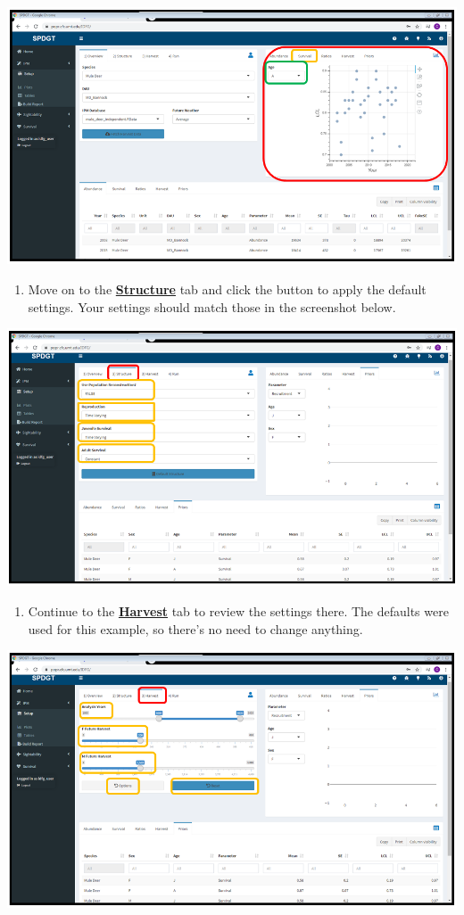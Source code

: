 \documentclass[
]{book}
\providecommand{\tightlist}{%
  \setlength{\itemsep}{0pt}\setlength{\parskip}{0pt}}
\begin{document}
\includegraphics{./www/ipm_04.PNG}

\begin{enumerate}
\def\labelenumi{\arabic{enumi}.}
\setcounter{enumi}{6}
\tightlist
\item
  Move on to the \protect\hyperlink{ipm-options}{\textbf{Structure}} tab and click the button to apply the default settings. Your settings should match those in the screenshot below.
\end{enumerate}

\includegraphics{./www/ipm_06.PNG}

\begin{enumerate}
\def\labelenumi{\arabic{enumi}.}
\setcounter{enumi}{7}
\tightlist
\item
  Continue to the \protect\hyperlink{ipm-options}{\textbf{Harvest}} tab to review the settings there. The defaults were used for this example, so there's no need to change anything.
\end{enumerate}

\includegraphics{./www/ipm_07.PNG}
\end{document}
